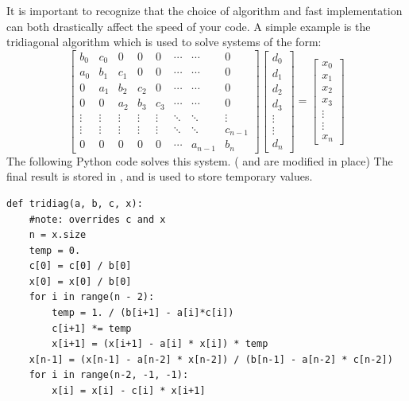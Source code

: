 It is important to recognize that the choice of algorithm and fast implementation can both drastically affect the speed of your code.
A simple example is the tridiagonal algorithm which is used to solve systems of the form:
\[\begin{bmatrix}
b_0 & c_0 & 0 & 0 & 0 & \cdots & \cdots & 0 \\
a_0 & b_1 & c_1 & 0 & 0 & \cdots & \cdots & 0 \\
0 & a_1 & b_2 & c_2 & 0 & \cdots & \cdots & 0 \\
0 & 0 & a_2 & b_3 & c_3 & \cdots & \cdots & 0 \\
\vdots & \vdots & \vdots & \vdots & \vdots & \ddots & \ddots & \vdots \\
\vdots & \vdots & \vdots & \vdots & \vdots & \ddots & \ddots & c_{n-1} \\
0 & 0 & 0 & 0 & 0 & \cdots & a_{n-1} & b_n
\end{bmatrix}
\begin{bmatrix}
d_0\\
d_1\\
d_2\\
d_3\\
\vdots\\
\vdots\\
d_n
\end{bmatrix}
=
\begin{bmatrix}
x_0\\
x_1\\
x_2\\
x_3\\
\vdots\\
\vdots\\
x_n
\end{bmatrix}\]
The following Python code solves this system.
( and  are modified in place)
The final result is stored in , and  is used to store temporary values.
\begin{lstlisting}
def tridiag(a, b, c, x):
    #note: overrides c and x
    n = x.size
    temp = 0.
    c[0] = c[0] / b[0]
    x[0] = x[0] / b[0]
    for i in range(n - 2):
        temp = 1. / (b[i+1] - a[i]*c[i])
        c[i+1] *= temp
        x[i+1] = (x[i+1] - a[i] * x[i]) * temp
    x[n-1] = (x[n-1] - a[n-2] * x[n-2]) / (b[n-1] - a[n-2] * c[n-2])
    for i in range(n-2, -1, -1):
        x[i] = x[i] - c[i] * x[i+1]
\end{lstlisting}

